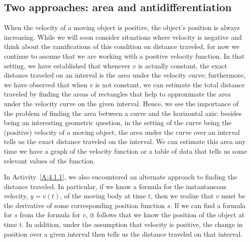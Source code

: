 

\subsection*{Two approaches: area and antidifferentiation}

When the velocity of a moving object is positive, the object's position is always increasing.  While we will soon consider situations where velocity is negative and think about the ramifications of this condition on distance traveled, for now we continue to assume that we are working with a positive velocity function.  In that setting, we have established that whenever $v$ is actually constant, the exact distance traveled on an interval is the area under the velocity curve; furthermore, we have observed that when $v$ is not constant, we can estimate the total distance traveled by finding the areas of rectangles that help to approximate the area under the velocity curve on the given interval.  Hence, we see the importance of the problem of finding the area between a curve and the horizontal axis:  besides being an interesting geometric question, in the setting of the curve being the (positive) velocity of a moving object, the area under the curve over an interval tells us the exact distance traveled on the interval.  We can estimate this area any time we have a graph of the velocity function or a table of data that tells us some relevant values of the function.

In Activity~\ref{A:4.1.1}, we also encountered an alternate approach to finding the distance traveled.  In particular, if we know a formula for the instantaneous velocity, $y = v(t)$, of the moving body at time $t$, then we realize that $v$ must be the derivative of some corresponding position function $s$.  If we can find a formula for $s$ from the formula for $v$, it follows that we know the position of the object at time $t$.  In addition, under the assumption that velocity is positive, the change in position over a given interval then tells us the distance traveled on that interval.  

